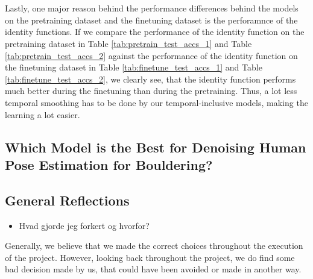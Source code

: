 \documentclass[./main.tex]{subfiles}
\begin{document}
\\
\\
Lastly, one major reason behind the performance differences behind the models on the pretraining dataset and the finetuning dataset is the perforamnce of the identity functions. If we compare the performance of the identity function on the pretraining dataset in Table \ref{tab:pretrain_test_accs_1} and Table \ref{tab:pretrain_test_accs_2} against the performance of the identity function on the finetuning dataset in Table \ref{tab:finetune_test_accs_1} and Table \ref{tab:finetune_test_accs_2}, we clearly see, that the identity function performs much better during the finetuning than during the pretraining. Thus, a lot less temporal smoothing has to be done by our temporal-inclusive models, making the learning a lot easier.

\subsection{Which Model is the Best for Denoising Human Pose Estimation for Bouldering?}

\subsection{General Reflections}
\begin{itemize}
    \item Hvad gjorde jeg forkert og hvorfor?
\end{itemize}
Generally, we believe that we made the correct choices throughout the execution of the project. However, looking back throughout the project, we do find some bad decision made by us, that could have been avoided or made in another way.
\end{document}
